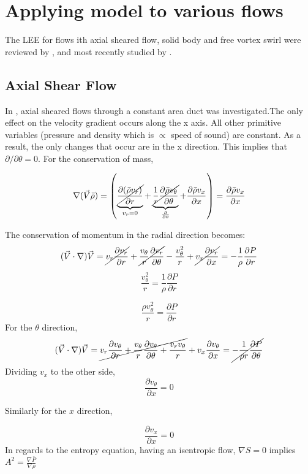 \section{Applying model to various flows}
The LEE for flows ith axial sheared flow, solid body and free vortex swirl
were reviewed by \cite{kousen1995eigenmode}, and most recently studied by \cite{Maldonado2016}.
\subsection{Axial Shear Flow}
In \cite{kousen1995eigenmode}, axial sheared flows through a constant area duct was 
investigated.The only effect on the velocity gradient occurs along the x axis. 
All other primitive variables (pressure and density which is $\propto$ speed of
sound) are constant. As a result, the only changes that occur are in the x
direction. This implies that $\partial / \partial \theta = 0$. 
For the conservation of mass,

\[ \nabla (\vec{V}\bar{\rho}) =  \left( 
\underbrace{
	\cancel{
		\frac{\partial (\bar{\rho}v_r)	}{\partial r}
	}
}_{v_r = 0} +
\underbrace{\cancel{\frac{1}{r}	\frac{\partial \bar{\rho}v_{\theta}}{\partial \theta}}}_{\frac{\partial }{\partial \theta}} +
\frac{\partial \bar{\rho}v_x}{\partial x}
\right) = \frac{\partial \bar{\rho}v_x}{\partial x}\] 

The conservation of momentum in the radial direction becomes:
\[(\vec{V}\cdot \nabla) \vec{V} =
\cancel{v_r \frac{\partial v_r}{\partial r}} +
\cancel{\frac{v_{\theta}  }{r}
	\frac{\partial v_r}{\partial \theta}}- \frac{v_{\theta}^2}{r}+ 
\cancel{v_x \frac{\partial v_r}{\partial x} }
= -\frac{1}{\rho} \frac{\partial P}{\partial r}
\]
\[
\frac{v_{\theta}^2}{r}
= \frac{1}{\rho} \frac{\partial P}{\partial r}
\] 

\[
\frac{{\rho} v_{\theta}^2}{r} 
=\frac{\partial P}{\partial r}
\]
For the $\theta$ direction,
\[(\vec{V}\cdot \nabla) \vec{V} = \cancel{v_r \frac{\partial v_{\theta}}{\partial r} +
	\frac{v_{\theta}}{r}
	\frac{\partial v_{\theta}}{\partial \theta} +
	\frac{v_r v_{\theta}}{r}}+ 
v_x \frac{\partial v_{\theta}}{\partial x} 
= \cancel{-\frac{1}{\rho r} \frac{\partial P}{\partial \theta}}\]
Dividing $v_x$ to the other side,
\[ \frac{\partial v_{\theta}}{\partial x}  = 0\]

Similarly for the $x$ direction,

\[ \frac{\partial v_x}{\partial x} = 0 \]
In regards to the entropy equation, having an isentropic flow, $\nabla S = 0$ implies $A^2= \frac{\nabla \bar{P}}{ \nabla \bar{\rho}}$ 


